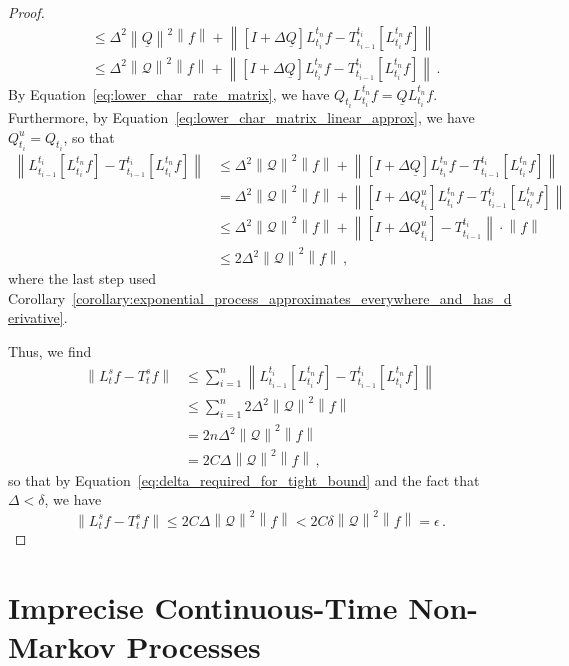 \documentclass[10pt]{paper}
\newcommand{\lrate}{\underline{Q}}
\newcommand{\norm}[1]{\left\lVert #1 \right\rVert}
\begin{document}
\begin{proof}
\begin{align*}
&\leq \Delta^2\norm{\lrate}^2\norm{f} + \norm{\left[I+\Delta\lrate\right]L_{t_i}^{t_n}f - T_{t_{i-1}}^{t_i}\left[L_{t_i}^{t_n}f\right]} \\
&\leq \Delta^2\norm{\mathcal{Q}}^2\norm{f} + \norm{\left[I+\Delta\lrate\right]L_{t_i}^{t_n}f - T_{t_{i-1}}^{t_i}\left[L_{t_i}^{t_n}f\right]}\,.
\end{align*}
By Equation~\eqref{eq:lower_char_rate_matrix}, we have $Q_{t_i}L_{t_i}^{t_n}f = \lrate L_{t_i}^{t_n}f$. Furthermore, by Equation~\eqref{eq:lower_char_matrix_linear_approx}, we have $Q_{t_i}^u=Q_{t_i}$, so that
\begin{align*}
\norm{L_{t_{i-1}}^{t_i}\left[L_{t_i}^{t_n}f\right] - T_{t_{i-1}}^{t_i}\left[L_{t_i}^{t_n}f\right]} &\leq \Delta^2\norm{\mathcal{Q}}^2\norm{f} + \norm{\left[I+\Delta\lrate\right]L_{t_i}^{t_n}f - T_{t_{i-1}}^{t_i}\left[L_{t_i}^{t_n}f\right]} \\
 &= \Delta^2\norm{\mathcal{Q}}^2\norm{f} + \norm{\left[I+\Delta Q_{t_i}^u\right]L_{t_i}^{t_n}f - T_{t_{i-1}}^{t_i}\left[L_{t_i}^{t_n}f\right]} \\
 &\leq \Delta^2\norm{\mathcal{Q}}^2\norm{f} + \norm{\left[I+\Delta Q_{t_i}^u\right] - T_{t_{i-1}}^{t_i}}\cdot\norm{f}\\
 &\leq 2\Delta^2\norm{\mathcal{Q}}^2\norm{f}\,,
\end{align*}
where the last step used Corollary~\ref{corollary:exponential_process_approximates_everywhere_and_has_derivative}.

Thus, we find
\begin{align*}
\norm{L_t^sf - T_t^sf} &\leq \sum_{i=1}^n \norm{L_{t_{i-1}}^{t_i}\left[L_{t_i}^{t_n}f\right] - T_{t_{i-1}}^{t_i}\left[L_{t_i}^{t_n}f\right]} \\
 &\leq \sum_{i=1}^n 2\Delta^2\norm{\mathcal{Q}}^2\norm{f} \\
 &= 2n\Delta^2\norm{\mathcal{Q}}^2\norm{f} \\
 &= 2C\Delta\norm{\mathcal{Q}}^2\norm{f}\,,
\end{align*}
so that by Equation~\eqref{eq:delta_required_for_tight_bound} and the fact that $\Delta<\delta$, we have
\begin{equation*}
\norm{L_t^sf - T_t^sf} \leq 2C\Delta\norm{\mathcal{Q}}^2\norm{f} < 2C\delta\norm{\mathcal{Q}}^2\norm{f} = \epsilon\,.
\end{equation*}
\end{proof}

\section{Imprecise Continuous-Time Non-Markov Processes}\label{sec:imp_non_markov}
\end{document}
